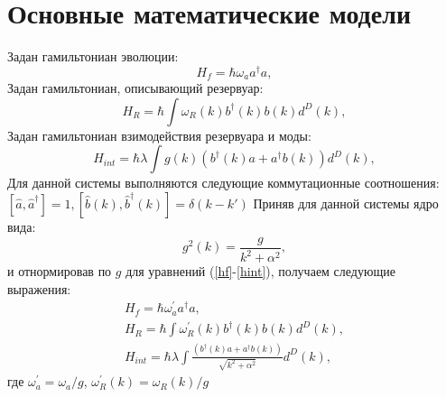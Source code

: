 \chapter{Основные математические модели }

Задан гамильтониан эволюции:
\begin{equation}\label{hf}
    H_f = \hbar \omega_a a^{\dagger} a,
\end{equation}
Задан гамильтониан, описывающий резервуар:
\begin{equation}\label{hr}
    H_R = \hbar \int \omega_{R}(k) b^{\dagger}(k) b(k) d^{D}(k),
\end{equation}
Задан гамильтониан взимодействия резервуара и моды:
\begin{equation}\label{hint}
    H_{int} = \hbar \lambda \int g(k) (b^{\dagger}(k) a + a^{\dagger} b(k)) d^{D}(k),
\end{equation}
Для данной системы выполняются следующие коммутационные соотношения:
$
[\hat{a}, \hat{a}^{\dagger}] = 1,
[\hat{b}(k), \hat{b}^{\dagger}(k)] = \delta (k-k')
$
Приняв для данной системы ядро вида:
\begin{equation}
    g^{2}(k) = \frac{g}{k^{2} + \alpha^{2}},
\end{equation}
и отнормировав по $g$ для уравнений (\ref{hf}-\ref{hint}), получаем следующие выражения:
\begin{gather}
    H_f = \hbar \omega^{'}_a a^{\dagger} a, \\
    H_R = \hbar \int \omega^{'}_{R}(k) b^{\dagger}(k) b(k) d^{D}(k), \\
    H_{int} = \hbar \lambda \int \frac{(b^{\dagger}(k) a + a^{\dagger} b(k))}{\sqrt{k^{2} + \alpha^{2}}} d^{D}(k),
\end{gather}
где $\omega^{'}_a = \omega_a/g$, $\omega^{'}_{R}(k) = \omega_{R}(k)/g$

